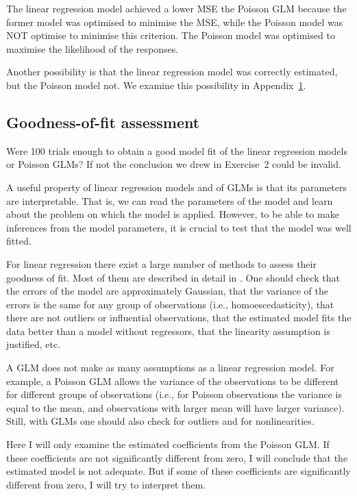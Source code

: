\documentclass[12pt]{article}
\begin{document}
The linear regression model achieved a lower MSE the Poisson GLM because the
former model was optimised to minimise the MSE, while the Poisson model was NOT
optimise to minimise this criterion. The Poisson model was optimised to maximise
the likelihood of the responses.

Another possibility is that the linear regression model was correctly
estimated, but the Poisson model not. We examine this possibility in
Appendix~\ref{sec:gof}.

\pagebreak

\begin{appendices}

\section{Goodness-of-fit assessment}
\label{sec:gof}

Were 100 trials enough to obtain a good model fit of the linear regression models or
	Poisson GLMs? If not the conclusion we drew in
	Exercise~2 could be invalid.

A useful property of linear regression models and of GLMs is that its
	parameters are interpretable. That is, we can read the parameters of
	the model and learn about the problem on which the model is applied.
	However, to be able to make inferences from the model parameters, it is
	crucial to test that the model was well fitted.

For linear regression there exist a large number of methods to assess their
	goodness of fit. Most of them are described in detail in
	\citet{kutnerEtAl05}. One should check that the errors of the model are
	approximately Gaussian, that the variance of the errors is the same for
	any group of observations (i.e., homoescedasticity), that there are not
	outliers or influential observations, that the estimated model fits the
	data better than a model without regressors, that the linearity
	assumption is justified, etc.

A GLM does not make as many assumptions as a linear regression model. For
	example, a Poisson GLM allows the variance of the observations to be
	different for different groups of observations (i.e., for Poisson
	observations the variance is equal to the mean, and observations with
	larger mean will have larger variance). Still, with GLMs one should
	also check for outliers and for nonlinearities.

Here I will only examine the estimated coefficients from the Poisson GLM. If
	these coefficients are not significantly different from zero, I will
	conclude that the estimated model is not adequate. But if some of these
	coefficients are significantly different from zero, I will try to
	interpret them.


\end{appendices}
\end{document}
